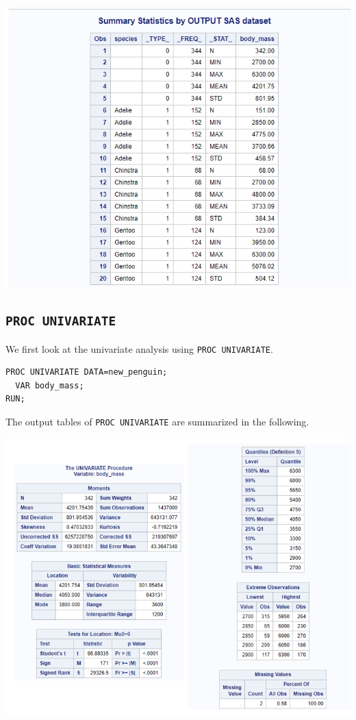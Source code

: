 \documentclass[
]{book}
\begin{document}
\begin{center}\includegraphics[width=1\linewidth]{img05/w05-outputSummaryData} \end{center}

\hypertarget{proc-univariate}{%
\subsection{\texorpdfstring{\texttt{PROC\ UNIVARIATE}}{PROC UNIVARIATE}}\label{proc-univariate}}

We first look at the univariate analysis using \texttt{PROC\ UNIVARIATE}.

\begin{verbatim}
PROC UNIVARIATE DATA=new_penguin;
  VAR body_mass;
RUN;
\end{verbatim}

The output tables of \texttt{PROC\ UNIVARIATE} are summarized in the following.

\begin{center}\includegraphics[width=1\linewidth]{img05/w05-UnivariateOutput} \end{center}
\end{document}

